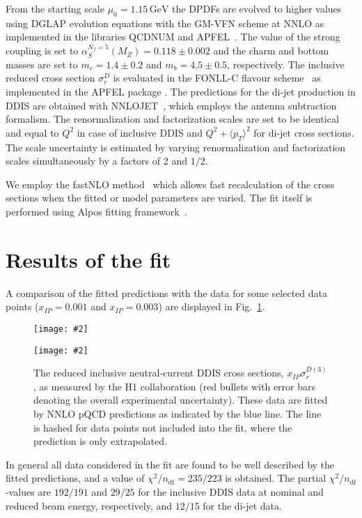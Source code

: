 \documentclass{PoS}
\newcommand{\IP}{I\!\!P}
\newcommand{\GeV}{\ensuremath{\mathrm{GeV}}\xspace}
\newcommand{\includegraphicss}[2][]{\texttt{[image: \#2]}}
\begin{document}
From the starting scale $\mu_0 = 1.15\,\GeV$ the DPDFs are evolved to higher values using DGLAP evolution equations with the GM-VFN scheme at NNLO as implemented in the libraries QCDNUM and APFEL~\cite{Botje:2010ay,Bertone:2013vaa}.
The value of the strong coupling is set to $\alpha_S^{N_f = 5} (M_Z) = 0.118\pm 0.002$ and the charm and bottom masses are set to $m_c = 1.4\pm 0.2$ and $m_b = 4.5\pm 0.5$, respectively.
The inclusive reduced cross section $\sigma_r^D$ is evaluated in the \mbox{FONLL-C} flavour scheme~\cite{Cacciari:1998it} as implemented in the APFEL package \cite{Bertone:2013vaa}.
The predictions for the di-jet production in DDIS are obtained with NNLOJET~\cite{Currie:2016ytq}, which employs the antenna subtraction formalism.
The renormalization and factorization scales are set to be identical and equal to $Q^2$ in case of inclusive DDIS and $Q^2 + \langle p_T\rangle^2$ for di-jet cross sections.
The scale uncertainty is estimated by varying renormalization and factorization scales simultaneously by a factors of 2 and $1/2$.

We employ the fastNLO method~\cite{Britzger:2012bs} which allows fast recalculation of the cross sections when the fitted or model parameters are varied.
The fit itself is performed using Alpos fitting framework~\cite{yyy}.


\section{Results of the fit}

A comparison of the fitted predictions with the data for some selected data points ($x_{\IP} = 0.001$ and $x_{\IP} = 0.003$) are displayed in Fig.~\ref{figDDISfit}.
\begin{figure}[tbhp]
\centering
\begin{minipage}[t]{0.47\textwidth}
\includegraphicss[trim={0cm 0.0cm 0 0.0cm},clip,width=.9\textwidth]{{{plots/H1prelim-19-013.fig11}}}
\end{minipage}
\begin{minipage}[t]{0.47\textwidth}
\includegraphicss[trim={0cm 1.2cm 0 1.1cm},clip,width=.9\textwidth]{{{plots/H1prelim-19-013.fig10}}}
\end{minipage}
\caption{The reduced inclusive neutral-current DDIS cross sections, $x_{\IP}\sigma_r^{D(3)}$, as measured by the H1 collaboration (red bullets with error bars denoting the overall experimental uncertainty). These data are fitted by NNLO pQCD predictions as indicated by the blue line. The line is hashed for data points not included into the fit, where the prediction is only extrapolated.}
\label{figDDISfit}
\end{figure}
In general all data considered in the fit are found to be well described by the fitted predictions, and
a value of $\chi^2/n_\mathrm{df} = 235/223$ is obtained.
The partial $\chi^2/n_\mathrm{df}$-values are $192/191$  and $29/25$ for the inclusive DDIS data at nominal and reduced beam energy, respectively, and $12/15$ for the di-jet data.
\end{document}
